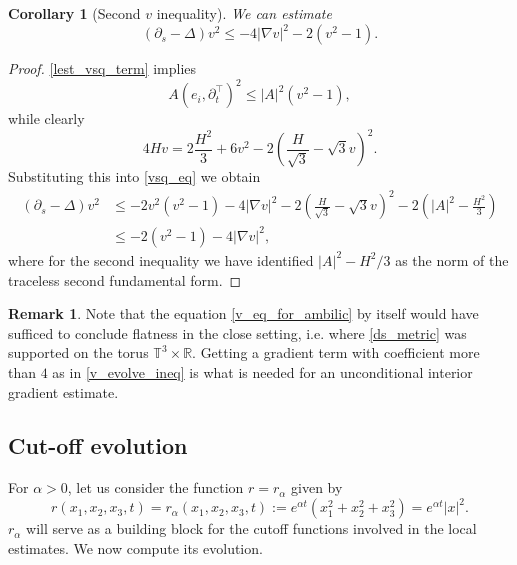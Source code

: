 \documentclass[leqno,11pt]{amsart}
\newtheorem{corollary}[theorem]{Corollary}
\theoremstyle{definition}
\newtheorem{remark}[theorem]{Remark}
\begin{document}
\begin{corollary}[Second $v$ inequality]
We can estimate
\begin{equation}\label{v_eq_for_ambilic}
(\partial_s-\Delta) v^2 \leq -4|\nabla v|^2-2(v^2-1).
\end{equation}
\end{corollary}
\begin{proof}
\eqref{lest_vsq_term} implies 
\begin{equation}
A(e_i,\partial_t^{\top})^2\leq |A|^2(v^2-1), 
\end{equation}
while clearly 
\begin{equation}
4Hv= 2\frac{H^2}{3}+6v^2-2\left(\frac{H}{\sqrt{3}}-\sqrt{3}v\right)^2.
\end{equation}
Substituting this into \eqref{vsq_eq} we obtain
\begin{align}\label{vsq_ineq3}
\left(\partial_s-\Delta\right)v^2 &\leq -2v^2(v^2-1)-4|\nabla v|^2-2\left(\frac{H}{\sqrt{3}}-\sqrt{3}v\right)^2-2\left(|A|^2-\frac{H^2}{3}\right)\\
&\leq -2(v^2-1)-4|\nabla v|^2,
\end{align}
where for the second inequality we have identified $|A|^2-H^2/3$ as the norm of the traceless second fundamental form. 
\end{proof}

\begin{remark}
Note that the equation \eqref{v_eq_for_ambilic} by itself would have sufficed to conclude flatness in the close setting, i.e. where \eqref{ds_metric} was supported on the torus $\mathbb{T}^3\times \mathbb{R}$. Getting a gradient term with coefficient more than $4$ as in \eqref{v_evolve_ineq} is what is needed for an unconditional interior gradient estimate.
\end{remark}

\subsection*{Cut-off evolution} For $\alpha>0$, let us consider the function $r=r_{\alpha}$ given by  
\begin{equation}\label{r_def}
r(x_1,x_2,x_3,t)=r_{\alpha}(x_1,x_2,x_3,t):=e^{\alpha t}(x_1^2+x_2^2+x_3^2)=e^{\alpha t}|x|^2.
\end{equation}
$r_{\alpha}$  will serve as a building block for the cutoff functions involved in the local estimates. We now compute its evolution.
\end{document}
